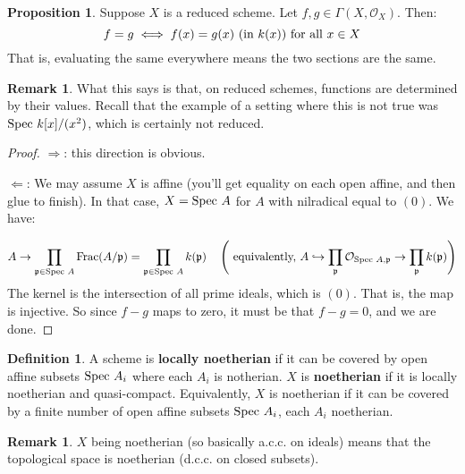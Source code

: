 \documentclass[10pt,reqno]{amsart}
\theoremstyle{definition}
\newtheorem{definition}[theorem]{Definition}
\newtheorem{proposition}[theorem]{Proposition}
\newtheorem{remark}[theorem]{Remark}
\theoremstyle{remark}
\numberwithin{equation}{section}
\numberwithin{theorem}{section}
\newcommand{\OO}{{\mathcal O}}
\newcommand{\spec}{\textup{Spec }}
\newcommand{\pp}{\frak{p}}
\begin{document}
\begin{proposition} Suppose $X$ is a reduced scheme. Let $f,g \in \Gamma(X,\OO_X)$. Then:
\[f = g \iff f(x) = g(x) \textup{ (in $k(x))$ for all $x \in X$}\]
That is, evaluating the same everywhere means the two sections are the same.
\end{proposition}
\begin{remark} What this says is that, on reduced schemes, functions are determined by their values. Recall that the example of a setting where this is not true was $\spec k[x]/(x^2)$, which is certainly not reduced.
\end{remark}

\begin{proof}\text{ }
$\Rightarrow$: this direction is obvious.

$\Leftarrow$: We may assume $X$ is affine (you'll get equality on each open affine, and then glue to finish). In that case, $X = \spec A$ for $A$ with nilradical equal to $(0)$. We have:

\[A \to \prod_{\pp \in \spec A} \textup{Frac}(A/\pp) = \prod_{\pp \in \spec A} k(\pp) \quad \left(\textup{ equivalently, $A \hookrightarrow \prod_{\pp} \OO_{\spec A,\pp} \to \prod_{\pp} k(\pp)$}\right)\]
The kernel is the intersection of all prime ideals, which is $(0)$. That is, the map is injective. So since $f-g$ maps to zero, it must be that $f-g = 0$, and we are done.
\end{proof}

\begin{definition} A scheme is \textbf{locally noetherian} if it can be covered by open affine subsets $\spec A_i$ where each $A_i$ is notherian. $X$ is \textbf{noetherian} if it is locally noetherian and quasi-compact. Equivalently, $X$ is noetherian if it can be covered by a finite number of open affine subsets $\spec A_i$, each $A_i$ noetherian.
\end{definition}

\begin{remark} $X$ being noetherian (so basically a.c.c. on ideals) means that the topological space is noetherian (d.c.c. on closed subsets).
\end{remark}
\end{document}
